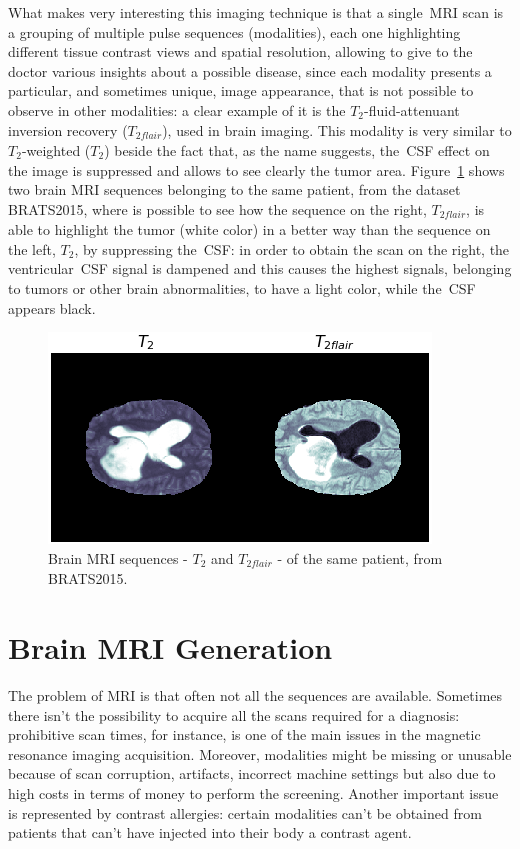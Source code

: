 \vspace{2mm} %
What makes very interesting this imaging technique is that a single~\ac{MRI} scan is a grouping of multiple pulse sequences (modalities), each one highlighting different tissue contrast views and spatial resolution, allowing to give to the doctor various insights about a possible disease, since each modality presents a particular, and sometimes unique, image appearance, that is not possible to observe in other modalities: a clear example of it is the $T_{2}$-fluid-attenuant inversion recovery ($T_{2\textit{flair}}$), used in brain imaging. This modality is very similar to $T_{2}$-weighted ($T_{2}$) beside the fact that, as the name suggests, the~\ac{CSF} effect on the image is suppressed and allows to see clearly the tumor area. 
Figure~\ref{fig:t2_vs_t2flair} shows two brain MRI sequences belonging to the same patient, from the dataset BRATS2015, where is possible to see how the sequence on the right, $T_{2\textit{flair}}$, is able to highlight the tumor (white color) in a better way than the sequence on the left, $T_{2}$, by suppressing the~\ac{CSF}: in order to obtain the scan on the right, the ventricular~\ac{CSF} signal is dampened and this causes the highest signals, belonging to tumors or other brain abnormalities, to have a light color, while the~\ac{CSF} appears black.

\begin{figure}[htbp!]
\centering
\includegraphics[height=0.20\textheight]{images/t2_vs_t2flair.pdf}
\caption[Brain MRI sequences from BRATS2015: $T_{2}$ and $T_{2\textit{flair}}$]{Brain MRI sequences - $T_{2}$ and $T_{2\textit{flair}}$ - of the same patient, from BRATS2015.}
\label{fig:t2_vs_t2flair}
\end{figure}

\section{Brain MRI Generation}
\label{sec:brain_mri_generation}
The problem of \ac{MRI} is that often not all the sequences are available. Sometimes there isn't the possibility to acquire all the scans required for a diagnosis: prohibitive scan times, for instance, is one of the main issues in the magnetic resonance imaging acquisition. Moreover, modalities might be missing or unusable because of scan corruption, artifacts, incorrect machine settings but also due to high costs in terms of money to perform the screening.
Another important issue is represented by contrast allergies: certain modalities can't be obtained from patients that can't have injected into their body a contrast agent.


